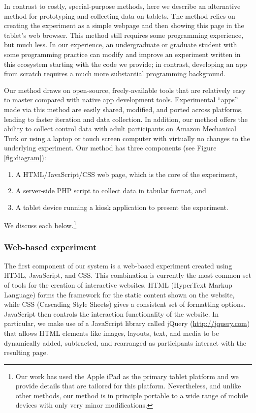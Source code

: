 \documentclass[man,noapacite]{apa2}
\begin{document}
In contrast to costly, special-purpose methods, here we describe an alternative method for prototyping and collecting data on tablets. The method relies on creating the experiment as a simple webpage and then showing this page in the tablet's web browser. This method still requires some programming experience, but much less. In our experience, an undergraduate or graduate student with some programming practice can modify and improve an experiment written in this ecosystem starting with the code we provide; in contrast, developing an app from scratch requires a much more substantial programming background.

Our method draws on open-source, freely-available tools that are relatively easy to master compared with native app development tools. Experimental ``apps'' made via this method are easily shared, modified, and ported across platforms, leading to faster iteration and data collection. In addition, our method offers the ability to collect control data with adult participants on Amazon Mechanical Turk  \cite{paolacci2010,crump2013} or using a laptop or touch screen computer with virtually no changes to the underlying experiment. Our method has three components (see Figure \ref{fig:diagram}):

\begin{enumerate}
\item A HTML/JavaScript/CSS web page, which is the core of the experiment, 
\item A server-side PHP script to collect data in tabular format, and
\item A tablet device running a kiosk application to present the experiment. 
\end{enumerate}

\noindent We discuss each below.\footnote{Our work has used the Apple iPad as the primary tablet platform and we provide details that are tailored for this platform. Nevertheless, and unlike other methods, our method is in principle portable to a wide range of mobile devices with only very minor modifications.}

\subsubsection{Web-based experiment}

The first component of our system is a web-based experiment created using HTML, JavaScript, and CSS. This combination is currently the most common set of tools for the creation of interactive websites. HTML (HyperText Markup Language) forms the framework for the static content shown on the website, while CSS (Cascading Style Sheets) gives a consistent set of formatting options. JavaScript then controls the interaction functionality of the website. In particular, we make use of a JavaScript library called jQuery (\url{http://jquery.com}) that allows HTML elements like images, layouts, text, and media to be dynamically added, subtracted, and rearranged as participants interact with the resulting page. 
\end{document}
